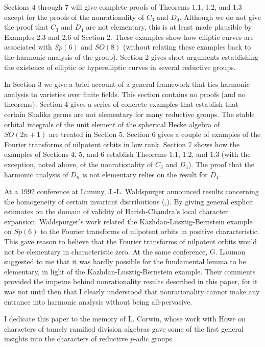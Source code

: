 \documentclass{amsart}
\begin{document}
Sections 4 through 7 will give complete proofs of Theorems 1.1, 1.2, and 1.3
except for the proofs of the nonrationality of $C_3$ and $D_4$.
Although we do not give the proof that $C_3$ and $D_4$ are not
elementary, this is at least made plausible by Examples 2.3 and 2.6
of Section 2.  These examples show how elliptic curves are associated
with $Sp(6)$ and $SO(8)$ (without relating these examples back to
the harmonic analysis of the group).  
  Section 2
gives short arguments establishing the existence of elliptic
or hyperelliptic
curves in several reductive groups.

In Section 3 we give a brief account of a general framework that
ties harmonic analysis to varieties over finite fields.  This section
contains no proofs (and no theorems).  Section 4 gives a series
of concrete examples that establish that certain Shalika
germs are not elementary for many reductive groups.  The stable orbital integrals
of the unit element of the spherical 
Hecke algebra of $SO(2n+1)$ are
treated in Section 5.  Section 6 gives a couple of examples of the
Fourier transforms of nilpotent orbits in low rank.  Section 7 shows
how the examples of Sections 4, 5, and 6 establish Theorems 1.1, 1.2,
and 1.3 
(with the exception, noted above, of the nonrationality of $C_3$ and $D_4$).
The proof that the harmonic analysis of
$D_n$ is not elementary relies on the result for $D_4$.

At a 1992 conference at Luminy, J.-L. Waldspurger announced
results concerning the homogeneity of certain invariant distributions
(\cite{W2},\cite{W3}).  By giving general explicit estimates on the domain of
validity of Harish-Chandra's local character expansion, Waldspurger's
work related the Kazhdan-Lusztig-Bernstein example on $Sp(6)$ to the
Fourier transforms of nilpotent orbits in positive characteristic.
This gave reason to believe that the Fourier transforms of nilpotent
orbits would not be elementary in characteristic zero. 
At the same conference, G. Laumon suggested to me that 
it was hardly possible for the fundamental lemma to be elementary,
in light of the
Kazhdan-Lusztig-Bernstein example.  Their comments provided the
impetus behind nonrationality results described in this paper, for
it was not until then that I clearly understood that 
nonrationality cannot make any entrance into harmonic
analysis without being all-pervasive.

I dedicate this paper to the memory of L. Corwin, 
whose work with Howe on characters of
tamely ramified division algebras gave
some of the first general
insights into the characters of reductive
$p$-adic groups.
\end{document}
